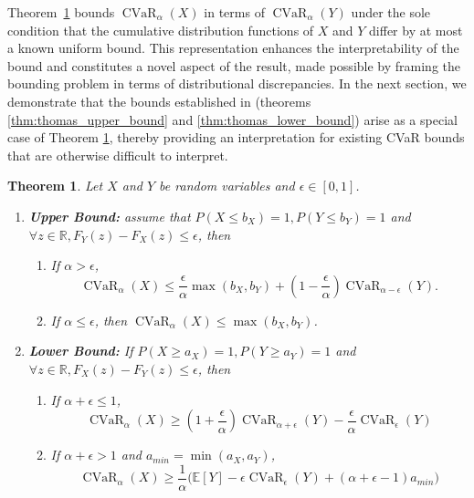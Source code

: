 \documentclass[acmlarge, manuscript, screen, review, natbib=false, oneside]{acmart}
\newtheorem{theorem}{Theorem}[section]
\DeclareMathOperator{\CVaR}{CVaR}
\newcommand{\KP}[1]{\textcolor{red}{#1}}
\newcommand{\VI}[1]{\textcolor{blue}{#1}}
\begin{document}
Theorem~\ref{thm:cvar_bound_v2} bounds $\CVaR_\alpha(X)$ in terms of $\CVaR_\alpha(Y)$ under the sole condition that the cumulative distribution functions of $X$ and $Y$ differ by at most a known uniform bound. This representation enhances the interpretability of the bound and constitutes a novel aspect of the result, made possible by framing the bounding problem in terms of distributional discrepancies. In the next section, we demonstrate that the bounds established in \cite{pmlr-v97-thomas19a} (theorems \ref{thm:thomas_upper_bound} and \ref{thm:thomas_lower_bound}) arise as a special case of Theorem \ref{thm:cvar_bound_v2}, thereby providing an interpretation for existing CVaR bounds that are otherwise difficult to interpret.
\begin{theorem}\label{thm:cvar_bound_v2}
	Let $X$ and $Y$ be random variables and $\epsilon \in [0, 1]$. %
	\begin{enumerate}
		\item \textbf{Upper Bound:} assume that $P(X\leq b_X)=1, P(Y\leq b_Y)=1$ and $\forall z\in \mathbb{R},F_Y(z)-F_X(z)\leq \epsilon$, then 
		\begin{enumerate}
			\item If $\alpha > \epsilon$, \begin{equation}\label{eq:general_cvar_upper_bound_1}
				\CVaR_\alpha(X) \leq \frac{\epsilon}{\alpha}\max(b_X,b_Y) + (1 - \frac{\epsilon}{\alpha})\CVaR_{\alpha-\epsilon}(Y).
			\end{equation}
			
			\item If $\alpha \leq \epsilon$, then $\CVaR_\alpha(X)\leq \max(b_X,b_Y)$.
		\end{enumerate}
		
		\item \textbf{Lower Bound:} If $P(X\geq a_X)=1, P(Y\geq a_Y)=1$ and $\forall z\in \mathbb{R},F_X(z)-F_Y(z)\leq \epsilon$, then
		\begin{enumerate}
			\item If $\alpha+\epsilon \leq 1$,  \begin{equation}\label{eq:general_cvar_lower_bound_1}
				\CVaR_{\alpha}(X)\geq (1+\frac{\epsilon}{\alpha})\CVaR_{\alpha+\epsilon}(Y)-\frac{\epsilon}{\alpha} \CVaR_{\epsilon}(Y)
			\end{equation}
			
			\item If $\alpha+\epsilon > 1$ and $a_{min} = \min(a_X, a_Y)$, \begin{equation}
				\CVaR_\alpha(X) \geq \frac{1}{\alpha}\big(\mathbb{E}[Y] - \epsilon \CVaR_\epsilon(Y) + (\alpha+\epsilon-1)a_{min}\big)
			\end{equation}
		\end{enumerate}
	\end{enumerate}
\end{theorem}
\end{document}
